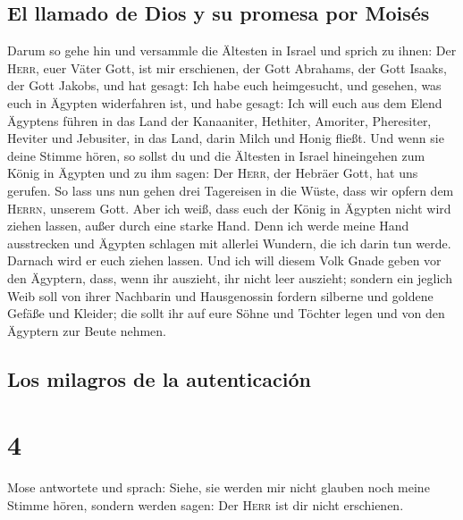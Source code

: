 \hypertarget{el-llamado-de-dios-y-su-promesa-por-moisuxe9s}{%
\subsection{El llamado de Dios y su promesa por
Moisés}\label{el-llamado-de-dios-y-su-promesa-por-moisuxe9s}}

 Darum so gehe hin und versammle die Ältesten in Israel
und sprich zu ihnen: Der \textsc{Herr}, euer Väter Gott, ist mir
erschienen, der Gott Abrahams, der Gott Isaaks, der Gott Jakobs, und hat
gesagt: Ich habe euch heimgesucht, und gesehen, was euch in Ägypten
widerfahren ist,  und habe gesagt: Ich will euch aus dem
Elend Ägyptens führen in das Land der Kanaaniter, Hethiter, Amoriter,
Pheresiter, Heviter und Jebusiter, in das Land, darin Milch und Honig
fließt.  Und wenn sie deine Stimme hören, so sollst du
und die Ältesten in Israel hineingehen zum König in Ägypten und zu ihm
sagen: Der \textsc{Herr}, der Hebräer Gott, hat uns gerufen. So lass uns
nun gehen drei Tagereisen in die Wüste, dass wir opfern dem
\textsc{Herrn}, unserem Gott.  Aber ich weiß, dass euch
der König in Ägypten nicht wird ziehen lassen, außer durch eine starke
Hand.  Denn ich werde meine Hand ausstrecken und Ägypten
schlagen mit allerlei Wundern, die ich darin tun werde. Darnach wird er
euch ziehen lassen.  Und ich will diesem Volk Gnade geben
vor den Ägyptern, dass, wenn ihr auszieht, ihr nicht leer auszieht;
 sondern ein jeglich Weib soll von ihrer Nachbarin und
Hausgenossin fordern silberne und goldene Gefäße und Kleider; die sollt
ihr auf eure Söhne und Töchter legen und von den Ägyptern zur Beute
nehmen.

\hypertarget{los-milagros-de-la-autenticaciuxf3n}{%
\subsection{Los milagros de la
autenticación}\label{los-milagros-de-la-autenticaciuxf3n}}

\hypertarget{section-3}{%
\section{4}\label{section-3}}

 Mose antwortete und sprach: Siehe, sie werden mir nicht
glauben noch meine Stimme hören, sondern werden sagen: Der \textsc{Herr}
ist dir nicht erschienen.


